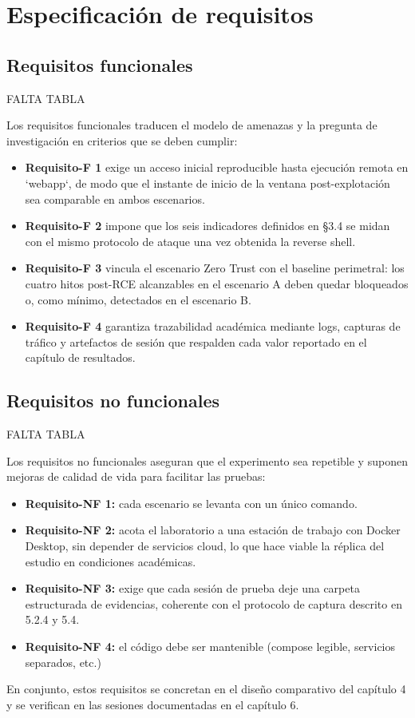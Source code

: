 \documentclass[11pt,spanish,listoffigures,listoftables]{tfgetsinf}
\begin{document}
    \section{Especificación de requisitos}
        \subsection{Requisitos funcionales}
        FALTA TABLA
        
        Los requisitos funcionales traducen el modelo de amenazas y la pregunta de investigación en criterios que se deben cumplir:
        \begin{itemize}
            \item \textbf{Requisito-F 1} exige un acceso inicial reproducible hasta ejecución remota en `webapp`, de modo que el instante de inicio de la ventana post-explotación sea comparable en ambos escenarios.
            \item \textbf{Requisito-F 2} impone que los seis indicadores definidos en §3.4 se midan con el mismo protocolo de ataque una vez obtenida la reverse shell.
            \item \textbf{Requisito-F 3} vincula el escenario Zero Trust con el baseline perimetral: los cuatro hitos post-RCE alcanzables en el escenario A deben quedar bloqueados o, como mínimo, detectados en el escenario B.
            \item \textbf{Requisito-F 4} garantiza trazabilidad académica mediante logs, capturas de tráfico y artefactos de sesión que respalden cada valor reportado en el capítulo de resultados.
        \end{itemize}
        
        \subsection{Requisitos no funcionales}
        FALTA TABLA
        
        Los requisitos no funcionales aseguran que el experimento sea repetible y suponen mejoras de calidad de vida para facilitar las pruebas:
        \begin{itemize}
            \item \textbf{Requisito-NF 1:} cada escenario se levanta con un único comando.
            \item \textbf{Requisito-NF 2:} acota el laboratorio a una estación de trabajo con Docker Desktop, sin depender de servicios cloud, lo que hace viable la réplica del estudio en condiciones académicas.
            \item \textbf{Requisito-NF 3:} exige que cada sesión de prueba deje una carpeta estructurada de evidencias, coherente con el protocolo de captura descrito en 5.2.4 y 5.4.
            \item \textbf{Requisito-NF 4:} el código debe ser mantenible (compose legible, servicios separados, etc.)
        \end{itemize}
        En conjunto, estos requisitos se concretan en el diseño comparativo del capítulo 4 y se verifican en las sesiones documentadas en el capítulo 6.
        
\end{document}
